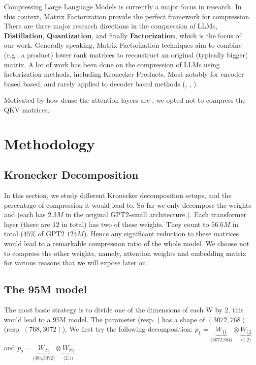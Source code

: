 \documentclass{article}
\begin{document}
Compressing Large Language Models is currently a major focus in research. In this context, Matrix Factorization provide the perfect framework for compression. There are three major research directions in the compression of LLMs, \textbf{Distillation}, \textbf{Quantization}, and finally \textbf{Factorization}, which is the focus of our work. Generally speaking, Matrix Factorization techniques aim to combine (e.g., a product) lower rank matrices to reconstruct an original (typically bigger) matrix. A lot of work has been done on the compression of LLMs using factorization methods, including Kronecker Products. Most notably for encoder based based, and rarely applied to decoder based methods (\cite{tahaei2022kroneckerbert}, \cite{edalati2021kroneckr}, \cite{abronin2024tqcompressor}).



Motivated by how dense the attention layers are \cite{}, we opted not to compress the QKV matrices.  






\section{Methodology}%
\label{sec:Training setups}

\subsection{Kronecker Decomposition}%
\label{sub:Kronecker Decomposition}

In this section, we study different Kronecker decomposition setups, and the percentage of compression it would  lead to. So far we only decompose the weights  and  (each has $2.3M$ in the original GPT2-small architecture.). Each transformer layer (there are $12$ in total) has two of these weights. They count to $56.6M$ in total ($45\%$ of GPT2 $124M$). Hence any significant reduction to these matrices would lead to a remarkable compression ratio of the whole model. We choose not to compress the other weights, namely, attention weights and embedding matrix for various reasons that we will expose later on. 

\subsection{The 95M model}%
\label{sub:The 95M model}
The most basic strategy is to divide one of the dimensions of each W by 2, this would lead to a 95M model. The parameter  (resp. ) has a shape of $(3072, 768)$ (resp.  $(768, 3072)$). We first try the following decomposition: $p_1 = \underbrace{W_{11}}_{\text{(3072,384)}} \otimes \underbrace{W_{12}}_{\text{(1,2)}}$  and $p_2 = \underbrace{W_{21}}_{\text{(384,3072)}} \otimes \underbrace{W_{22}}_{\text{(2,1)}}$  
\end{document}
